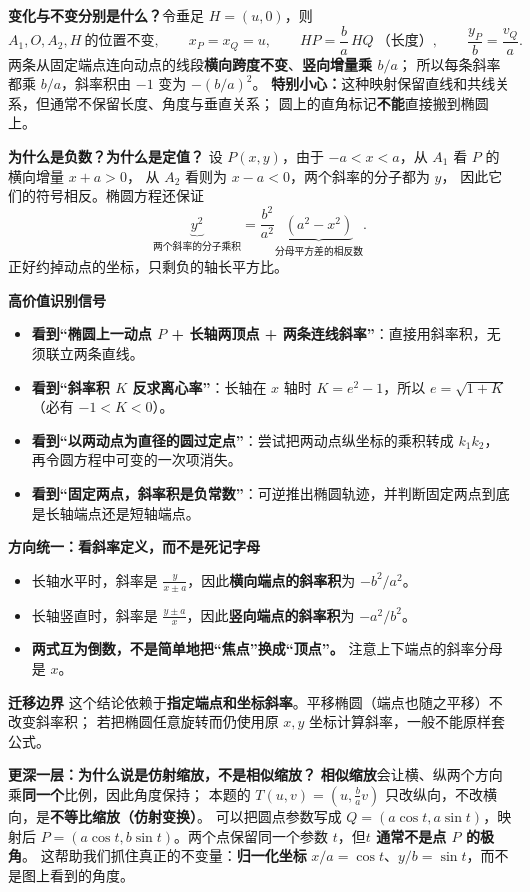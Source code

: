 \begin{explanationbox}
\textbf{变化与不变分别是什么？}令垂足 $H=(u,0)$，则
\[
 A_1,O,A_2,H\ \text{的位置不变},\qquad
 x_P=x_Q=u,\qquad
 HP=\frac ba\,HQ\ \text{（长度）},\qquad
 \frac{y_P}{b}=\frac{v_Q}{a}.
\]
两条从固定端点连向动点的线段\textbf{横向跨度不变}、\textbf{竖向增量乘 $b/a$}；
所以每条斜率都乘 $b/a$，斜率积由 $-1$ 变为 $-(b/a)^2$。
\textbf{特别小心：}这种映射保留直线和共线关系，但通常不保留长度、角度与垂直关系；
圆上的直角标记\textbf{不能}直接搬到椭圆上。


\medskip
\textbf{\textcolor{CExplanation}{为什么是负数？为什么是定值？}}
设 $P(x,y)$，由于 $-a<x<a$，从 $A_1$ 看 $P$ 的横向增量 $x+a>0$，
从 $A_2$ 看则为 $x-a<0$，两个斜率的分子都为 $y$，
因此它们的符号相反。椭圆方程还保证
\[
 \underbrace{y^2}_{\text{两个斜率的分子乘积}}
 =\frac{b^2}{a^2}\underbrace{(a^2-x^2)}_{\text{分母平方差的相反数}}.
\]
正好约掉动点的坐标，只剩负的轴长平方比。

\medskip
\textbf{\textcolor{CExplanation}{高价值识别信号}}
\begin{itemize}[leftmargin=*,itemsep=0.3em,topsep=0.3em]
 \item \textbf{看到“椭圆上一动点 $P$ + 长轴两顶点 + 两条连线斜率”}：直接用斜率积，无须联立两条直线。
 \item \textbf{看到“斜率积 $K$ 反求离心率”}：长轴在 $x$ 轴时 $K=e^2-1$，所以 $e=\sqrt{1+K}$（必有 $-1<K<0$）。
 \item \textbf{看到“以两动点为直径的圆过定点”}：尝试把两动点纵坐标的乘积转成 $k_1k_2$，再令圆方程中可变的一次项消失。
 \item \textbf{看到“固定两点，斜率积是负常数”}：可逆推出椭圆轨迹，并判断固定两点到底是长轴端点还是短轴端点。
\end{itemize}

\medskip
\textbf{\textcolor{CExplanation}{方向统一：看斜率定义，而不是死记字母}}
\begin{itemize}[leftmargin=*,itemsep=0.3em,topsep=0.3em]
 \item 长轴水平时，斜率是 $\frac{y}{x\pm a}$，因此\textbf{横向端点的斜率积}为 $-b^2/a^2$。
 \item 长轴竖直时，斜率是 $\frac{y\pm a}{x}$，因此\textbf{竖向端点的斜率积}为 $-a^2/b^2$。
 \item \textbf{两式互为倒数，不是简单地把“焦点”换成“顶点”。} 注意上下端点的斜率分母是 $x$。
\end{itemize}

\medskip
\textbf{\textcolor{CExplanation}{迁移边界}}
这个结论依赖于\textbf{指定端点和坐标斜率}。平移椭圆（端点也随之平移）不改变斜率积；
若把椭圆任意旋转而仍使用原 $x,y$ 坐标计算斜率，一般不能原样套公式。

\medskip
\textbf{\textcolor{CExplanation}{更深一层：为什么说是仿射缩放，不是相似缩放？}}
\textbf{相似缩放}会让横、纵两个方向乘\textbf{同一个}比例，因此角度保持；
本题的 $T(u,v)=(u,\frac ba v)$ 只改纵向，不改横向，是\textbf{不等比缩放（仿射变换）}。
可以把圆点参数写成 $Q=(a\cos t,a\sin t)$，映射后
$P=(a\cos t,b\sin t)$。两个点保留同一个参数 $t$，但\textbf{$t$ 通常不是点 $P$ 的极角}。
这帮助我们抓住真正的不变量：\textbf{归一化坐标} $x/a=\cos t$、$y/b=\sin t$，而不是图上看到的角度。
\end{explanationbox}
